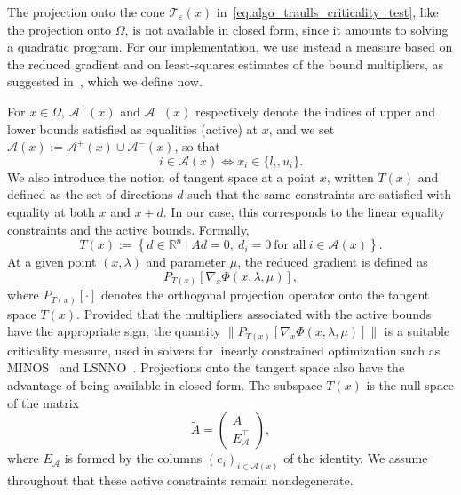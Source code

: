 \documentclass{article}
\numberwithin{equation}{section}
\newcommand{\RR}{{\mathbb{R}}} %
\newcommand{\calA}{{\mathcal{A}}}
\newcommand{\calT}{{\mathcal{T}}}
\newcommand{\proj}[2]{P_{#1} \left[ {#2} \right]} %
\theoremstyle{plain}
\begin{document}
The projection onto the cone $\calT_\varepsilon(x)$ in~\eqref{eq:algo_traulls_criticality_test}, like the projection onto $\Omega$, is not available in closed form, since it amounts to solving a quadratic program. For our implementation, we use instead a measure based on the reduced gradient and on least-squares estimates of the bound multipliers, as suggested in~\cite[Section~7.2]{conn-etal:1996b}, which we define now.

For $x \in \Omega$, $\calA^+(x)$ and $\calA^-(x)$ respectively denote the indices of upper and lower bounds satisfied as equalities (active) at $x$, and we set $\calA(x) := \calA^+(x) \cup \calA^-(x)$, so that
\begin{equation*}
	i \in \calA(x) \iff x_i \in \{l_i,u_i\}.
\end{equation*}
We also introduce the notion of tangent space at a point $x$, written $T(x)$ and defined as the set of directions $d$ such that the same constraints are satisfied with equality at both $x$ and $x+d$. In our case, this corresponds to the linear equality constraints and the active bounds. Formally,
\begin{equation}\label{eq:tangent_space}
	T(x) := \left\{ d \in \RR^n \ | \ Ad = 0,\ d_i=0\ \text{for all}\ i\in \calA(x)\right\}.
\end{equation}
At a given point \((x,\lambda)\) and parameter $\mu$, the reduced gradient is defined as
\begin{equation*}
	\proj{T(x)}{\nabla_x \Phi(x,\lambda,\mu)},
\end{equation*}
where $\proj{T(x)}{\cdot}$ denotes the orthogonal projection operator onto the tangent space $T(x)$.
Provided that the multipliers associated with the active bounds have the appropriate sign, the quantity $\|\proj{T(x)}{\nabla_x \Phi(x,\lambda,\mu)}\|$ is a suitable criticality measure, used in solvers for linearly constrained optimization such as MINOS~\cite{murtaghsaunders:1978} and LSNNO~\cite{tointtuyttens:1992}.
Projections onto the tangent space also have the advantage of being available in closed form. The subspace $T(x)$ is the null space of the matrix
\begin{equation}\label{eq:matrix_tangent_space}
	\tilde{A} = \begin{pmatrix}
		A \\ E_\calA^\top
	\end{pmatrix},
\end{equation}
where $E_\calA$ is formed by the columns $(e_i)_{i \in \calA(x)}$ of the identity. We assume throughout that these active constraints remain nondegenerate.
\end{document}
